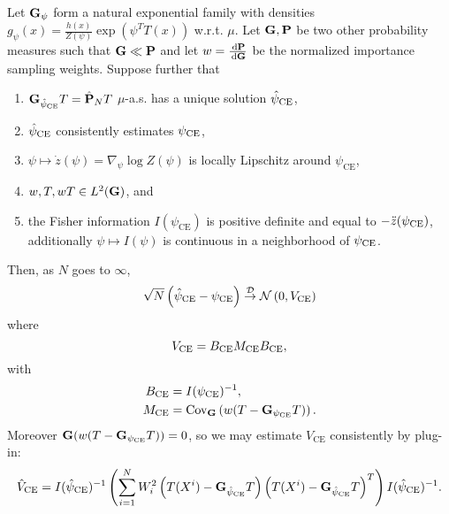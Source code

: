 \begin{theorem}
    \label{thm:ce-clt}
    Let $\mathbf G_{\psi}$ form a natural exponential family with densities $g_{\psi}(x) = \frac{h(x)}{Z(\psi)} \exp \left( \psi^{T}T(x)\right) $ w.r.t. $\mu$. Let $\mathbf G, \mathbf P$ be two other probability measures such that $\mathbf G \ll \mathbf P$ and let $w = \frac{\,\mathrm d \mathbf P}{\,\mathrm d \mathbf G}$ be the normalized importance sampling weights. 
    Suppose further that 
    \begin{enumerate}[label={\bfseries(A{\arabic*})}]
        \item\label{it:exist-unique-psice} $\mathbf G_{{\hat\psi_{\text{CE}}}} T = \hat{\mathbf P}_{N} T$ $\mu$-a.s. has a unique solution ${\hat\psi_{\text{CE}}}$,
        \item\label{it:ce-regularity} ${\hat\psi_{\text{CE}}}$ consistently estimates ${\psi_{\text{CE}}}$,
        \item\label{it:zdot-ll} $\psi \mapsto \dot z(\psi) = \nabla_\psi \log Z(\psi)$ is locally Lipschitz around $\psi_{\text{CE}}$,
        \item\label{it:w-t-wt-L2} $w,T,wT \in L^{2}(\mathbf G)$, and
        \item\label{it:FI-psd} the Fisher information $I(\psi_{\text{CE}})$ is positive definite and equal to $-\ddot z({\psi_{\text{CE}}})$, additionally $\psi \mapsto I(\psi)$ is continuous in a neighborhood of ${\psi_{\text{CE}}}$.
    \end{enumerate}

    Then, as $N$ goes to $\infty$,
    $$
        \sqrt{N} \left(\hat\psi_\text{CE} - \psi_{\text{CE}}\right) \stackrel{\mathcal D}{\to} \mathcal N \left(0, V_{\text{CE}}\right)
    $$
    where 
    $$
    V_{\text{CE}} = B_\ce M_\ce B_\ce,%
    $$
    with 
    \begin{align*}
        B_{{\text{CE}}} &= I({\psi_{\text{CE}}})^{-1}, \\
        M_{{\text{CE}}} &= \operatorname{Cov}_{\mathbf G} \left( w (T - \mathbf G_{{\psi_{\text{CE}}}}T) \right).
    \end{align*}
    Moreover $\mathbf G (w(T - \mathbf G_{{\psi_{\text{CE}}}}T)) = 0$, so we may estimate $V_{\text{CE}}$ consistently by plug-in:
    $$
    \hat V_{\text{CE}} = I(\hat\psi_{\text{CE}})^{-1}  \left(\sum_{i = 1}^N W^{2}_{i} \left(T(X^{i}) - \mathbf G_{{\hat\psi_{\text{CE}}}}T \right)\left(T(X^{i}) - \mathbf G_{{\hat\psi_{\text{CE}}}} T\right)^{T} \right)I(\hat\psi_{\text{CE}})^{-1}.
    $$
\end{theorem}

